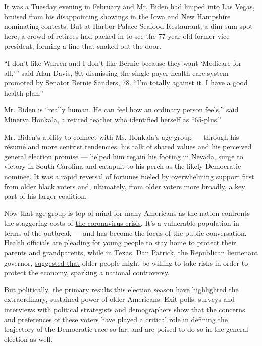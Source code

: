 It was a Tuesday evening in February and Mr. Biden had limped into Las
Vegas, bruised from his disappointing showings in the Iowa and New
Hampshire nominating contests. But at Harbor Palace Seafood Restaurant,
a dim sum spot here, a crowd of retirees had packed in to see the
77-year-old former vice president, forming a line that snaked out the
door.

``I don't like Warren and I don't like Bernie because they want
`Medicare for all,''' said Alan Davis, 80, dismissing the single-payer
health care system promoted by Senator
\href{https://www.nytimes3xbfgragh.onion/interactive/2020/us/elections/bernie-sanders.html}{Bernie
Sanders}, 78. ``I'm totally against it. I have a good health plan.''

Mr. Biden is ``really human. He can feel how an ordinary person feels,''
said Minerva Honkala, a retired teacher who identified herself as
``65-plus.''

Mr. Biden's ability to connect with Ms. Honkala's age group --- through
his résumé and more centrist tendencies, his talk of shared values and
his perceived general election promise --- helped him regain his footing
in Nevada, surge to victory in South Carolina and catapult to his perch
as the likely Democratic nominee. It was a rapid reversal of fortunes
fueled by overwhelming support first from older black voters and,
ultimately, from older voters more broadly, a key part of his larger
coalition.

Now that age group is top of mind for many Americans as the nation
confronts the staggering costs of
\href{https://www.nytimes3xbfgragh.onion/news-event/coronavirus}{the
coronavirus crisis}. It's a vulnerable population in terms of the
outbreak --- and has become the focus of the public conversation. Health
officials are pleading for young people to stay home to protect their
parents and grandparents, while in Texas, Dan Patrick, the Republican
lieutenant governor,
\href{https://www.nytimes3xbfgragh.onion/2020/03/24/us/coronavirus-texas-patrick-abbott.html}{suggested
that} older people might be willing to take risks in order to protect
the economy, sparking a national controversy.

But politically, the primary results this election season have
highlighted the extraordinary, sustained power of older Americans: Exit
polls, surveys and interviews with political strategists and
demographers show that the concerns and preferences of these voters have
played a critical role in defining the trajectory of the Democratic race
so far, and are poised to do so in the general election as well.

